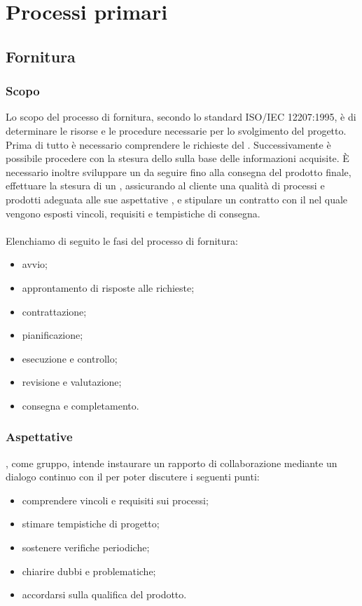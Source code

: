 \section{Processi primari}
\subsection{Fornitura}
\subsubsection{Scopo}
Lo scopo del processo di fornitura, secondo lo standard ISO/IEC 12207:1995, è di determinare le risorse e le procedure necessarie per lo svolgimento del progetto.\\
Prima di tutto è necessario comprendere le richieste del \proponProg{}. Successivamente è possibile procedere con la stesura dello \SdFv{} sulla base delle informazioni acquisite.
È necessario inoltre sviluppare un \PdPv{} da seguire fino alla consegna del prodotto finale, effettuare la stesura di un \PdQv{}, assicurando al cliente una qualità di processi e prodotti adeguata alle sue aspettative , e stipulare un contratto con il \proponProg{} nel quale vengono esposti vincoli, requisiti e tempistiche di consegna.\\\\
Elenchiamo di seguito le fasi del processo di fornitura:
\begin{itemize}
    \item{avvio;}
    \item{approntamento di risposte alle richieste;}
    \item{contrattazione;}
    \item{pianificazione;}
    \item{esecuzione e controllo;}
    \item{revisione e valutazione;}
    \item{consegna e completamento.}
\end{itemize}

\subsubsection{Aspettative}
\Omicron, come gruppo, intende instaurare un rapporto di collaborazione mediante un dialogo continuo con il \proponProg{} per poter discutere i seguenti punti:
\begin{itemize}
    \item{comprendere vincoli e requisiti sui processi;}
    \item{stimare tempistiche di progetto;}
    \item{sostenere verifiche periodiche;}
    \item{chiarire dubbi e problematiche;}
    \item{accordarsi sulla qualifica del prodotto.}
\end{itemize}

